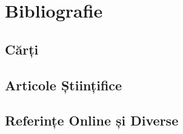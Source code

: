 \documentclass[../../main.tex]{subfiles}
\begin{document}
\chapter*{Bibliografie}
\label{ch:bibliography}


\section*{Cărți}
\label{sec:bibliography_books}


\printbibliography[type=book,heading=none]

\section*{Articole Științifice}
\label{sec:bibliography_papers}
\nocite{*}

\printbibliography[type=article,heading=none]
\printbibliography[type=inproceedings,heading=none]

\section*{Referințe Online și Diverse}
\label{sec:bibliography_misc}

\printbibliography[type=misc,heading=none]
\end{document}
